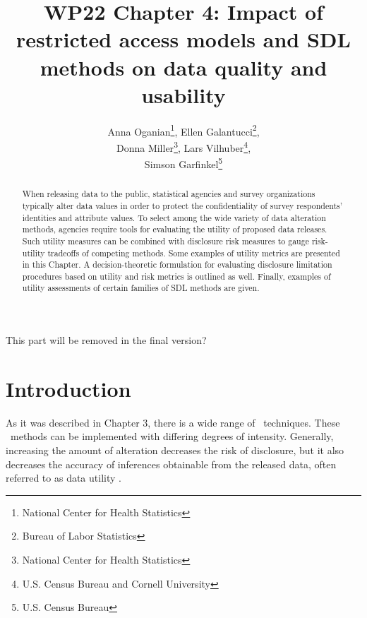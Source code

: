 \documentclass[12pt]{article}
\begin{document}
\title{WP22 Chapter 4: Impact of restricted access models and SDL methods on data quality and usability}

\author{%
Anna Oganian\thanks{National Center for Health Statistics}, 
Ellen Galantucci\thanks{Bureau of Labor Statistics}, \\
Donna Miller\thanks{National Center for Health Statistics}, 
Lars Vilhuber\thanks{U.S. Census Bureau and Cornell University}, \\
Simson Garfinkel\thanks{U.S. Census Bureau}
}

\maketitle
\newpage 
\begin{center}
    This part will be removed in the final version?
\end{center}
\tableofcontents

\newpage 

\begin{abstract}
When releasing data to the public, statistical agencies and survey
organizations typically alter data values in order to protect the
confidentiality of survey respondents' identities and attribute
values.  To select among the wide variety of data alteration
methods, agencies require tools for evaluating the utility of
proposed data releases.  Such utility measures can be combined
with disclosure risk measures to gauge risk-utility tradeoffs of
competing methods.  Some examples of utility metrics are presented in this Chapter.
A  decision-theoretic formulation for evaluating
disclosure limitation procedures based on utility and risk metrics is outlined
as well. Finally, examples of utility assessments of certain families of SDL methods are given. 


\end{abstract}

\section{Introduction}\label{sec.intro}

As it was described in Chapter 3, there is a wide range of \SDL\ techniques.
These \SDL\ methods can be implemented with differing degrees of
intensity.  Generally, increasing the amount of alteration
decreases the risk of disclosure, but it also decreases the
accuracy of inferences obtainable from the released data, often
referred to as data utility \citep{Hund10}.
\end{document}
